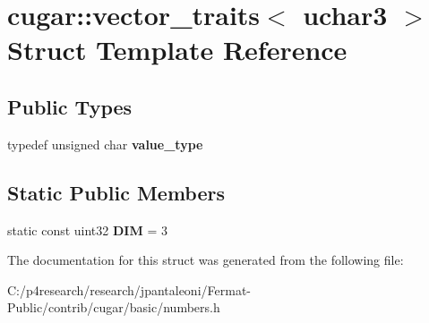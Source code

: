 \hypertarget{structcugar_1_1vector__traits_3_01uchar3_01_4}{}\section{cugar\+:\+:vector\+\_\+traits$<$ uchar3 $>$ Struct Template Reference}
\label{structcugar_1_1vector__traits_3_01uchar3_01_4}
\subsection*{Public Types}
\begin{DoxyCompactItemize}
\item 
\mbox{\label{structcugar_1_1vector__traits_3_01uchar3_01_4_aeea8c9be52e8ae7571d6c5bb8d08ddf0}} 
typedef unsigned char {\bfseries value\+\_\+type}
\end{DoxyCompactItemize}
\subsection*{Static Public Members}
\begin{DoxyCompactItemize}
\item 
\mbox{\label{structcugar_1_1vector__traits_3_01uchar3_01_4_a77a35e9bbe661eebb1b4a802837054d9}} 
static const uint32 {\bfseries D\+IM} = 3
\end{DoxyCompactItemize}


The documentation for this struct was generated from the following file\+:\begin{DoxyCompactItemize}
\item 
C\+:/p4research/research/jpantaleoni/\+Fermat-\/\+Public/contrib/cugar/basic/numbers.\+h\end{DoxyCompactItemize}
